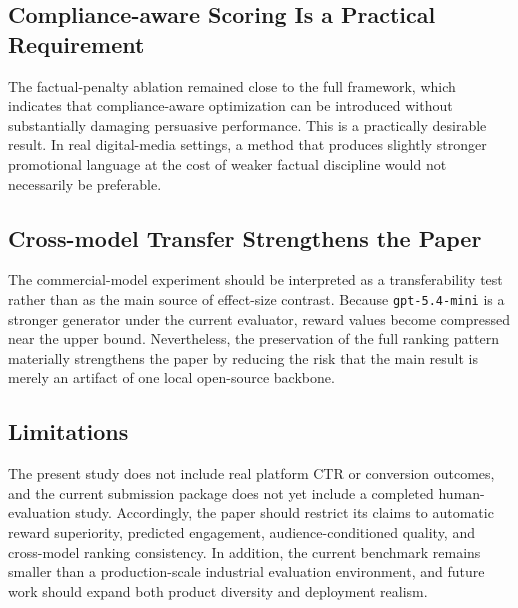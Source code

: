 \subsection{Compliance-aware Scoring Is a Practical Requirement}

The factual-penalty ablation remained close to the full framework, which indicates that compliance-aware optimization can be introduced without substantially damaging persuasive performance. This is a practically desirable result. In real digital-media settings, a method that produces slightly stronger promotional language at the cost of weaker factual discipline would not necessarily be preferable.

\subsection{Cross-model Transfer Strengthens the Paper}

The commercial-model experiment should be interpreted as a transferability test rather than as the main source of effect-size contrast. Because \texttt{gpt-5.4-mini} is a stronger generator under the current evaluator, reward values become compressed near the upper bound. Nevertheless, the preservation of the full ranking pattern materially strengthens the paper by reducing the risk that the main result is merely an artifact of one local open-source backbone.

\subsection{Limitations}

The present study does not include real platform CTR or conversion outcomes, and the current submission package does not yet include a completed human-evaluation study. Accordingly, the paper should restrict its claims to automatic reward superiority, predicted engagement, audience-conditioned quality, and cross-model ranking consistency. In addition, the current benchmark remains smaller than a production-scale industrial evaluation environment, and future work should expand both product diversity and deployment realism.
